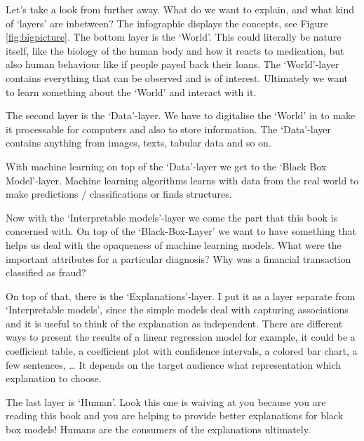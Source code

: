 \documentclass[12pt,]{krantz}
\theoremstyle{definition}
\theoremstyle{definition}
\theoremstyle{definition}
\theoremstyle{remark}
\begin{document}
Let's take a look from further away. What do we want to explain, and
what kind of `layers' are inbetween? The infographic displays the
concepts, see Figure \ref{fig:bigpicture}. The bottom layer is the
`World'. This could literally be nature itself, like the biology of the
human body and how it reacts to medication, but also human behaviour
like if people payed back their loans. The `World'-layer contains
everything that can be observed and is of interest. Ultimately we want
to learn something about the `World' and interact with it.

The second layer is the `Data'-layer. We have to digitalise the `World'
in to make it processable for computers and also to store information.
The `Data'-layer contains anything from images, texts, tabular data and
so on.

With machine learning on top of the `Data'-layer we get to the `Black
Box Model'-layer. Machine learning algorithms learns with data from the
real world to make predictions / classifications or finds structures.

Now with the `Interpretable models'-layer we come the part that this
book is concerned with. On top of the `Black-Box-Layer' we want to have
something that helps us deal with the opaqueness of machine learning
models. What were the important attributes for a particular diagnosis?
Why was a financial transaction classified as fraud?

On top of that, there is the `Explanations'-layer. I put it as a layer
separate from `Interpretable models', since the simple models deal with
capturing associations and it is useful to think of the explanation as
independent. There are different ways to present the results of a linear
regression model for example, it could be a coefficient table, a
coefficient plot with confidence intervals, a colored bar chart, a few
sentences, \ldots{} It depends on the target audience what
representation which explanation to choose.

The last layer is `Human'. Look this one is waiving at you because you
are reading this book and you are helping to provide better explanations
for black box models! Humans are the consumers of the explanations
ultimately.
\end{document}
